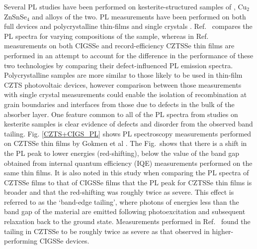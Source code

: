 \documentclass[11pt, twoside]{report}
\begin{document}
Several PL studies have been performed on kesterite-structured samples of {\CZTS}, Cu$_2$ZnSnSe$_4$ and alloys of the two. PL measurements have been performed on both full devices and polycrystalline thin-films \cite{band_tail, Gershon, Gershon_ref18, Romero, Miyamoto, Unold} and single crystals \cite{Halliday, Levcenko, Hones}. Ref.~ compares the PL spectra for varying compositions of the sample, whereas in Ref.~ measurements on both CIGSSe and record-efficiency CZTSSe thin films are performed in an attempt to account for the difference in the performance of these two technologies by comparing their defect-influenced PL emission spectra. Polycrystalline samples are more similar to those likely to be used in thin-film CZTS photovoltaic devices, however comparison between those measurements with single crystal measurements could enable the isolation of recombination at grain boundaries and interfaces from those due to defects in the bulk of the absorber layer. 
One feature common to all of the PL spectra from studies on kesterite samples is clear evidence of defects and disorder from the observed band tailing. 
Fig. \ref{CZTS+CIGS_PL} shows PL spectroscopy measurements performed on CZTSSe thin films by Gokmen et al \cite{band_tail}. The Fig.~shows that there is a shift in the PL peak to lower energies (red-shifting), below the value of the band gap obtained from internal quantum efficiency (IQE) measurements performed on the same thin films. It is also noted in this study when comparing the PL spectra of CZTSSe films to that of CIGSSe films that the PL peak for CZTSSe thin films is broader and that the red-shifting was roughly twice as severe. This effect is referred to as the `band-edge tailing', where photons of energies less than the band gap of the material are emitted following photoexcitation and subsequent relaxation back to the ground state. 
Measurements performed in Ref.~ found the tailing in CZTSSe to be roughly twice as severe as that observed in higher-performing CIGSSe devices.
\end{document}
